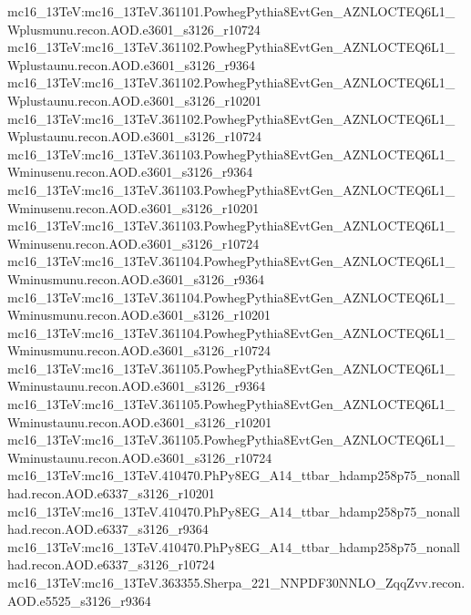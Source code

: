 { mc16\_13TeV:mc16\_13TeV.361101.PowhegPythia8EvtGen\_AZNLOCTEQ6L1\_Wplusmunu.recon.AOD.e3601\_s3126\_r10724\newline    
 mc16\_13TeV:mc16\_13TeV.361102.PowhegPythia8EvtGen\_AZNLOCTEQ6L1\_Wplustaunu.recon.AOD.e3601\_s3126\_r9364\newline    
 mc16\_13TeV:mc16\_13TeV.361102.PowhegPythia8EvtGen\_AZNLOCTEQ6L1\_Wplustaunu.recon.AOD.e3601\_s3126\_r10201\newline    
 mc16\_13TeV:mc16\_13TeV.361102.PowhegPythia8EvtGen\_AZNLOCTEQ6L1\_Wplustaunu.recon.AOD.e3601\_s3126\_r10724\newline    
 mc16\_13TeV:mc16\_13TeV.361103.PowhegPythia8EvtGen\_AZNLOCTEQ6L1\_Wminusenu.recon.AOD.e3601\_s3126\_r9364\newline    
 mc16\_13TeV:mc16\_13TeV.361103.PowhegPythia8EvtGen\_AZNLOCTEQ6L1\_Wminusenu.recon.AOD.e3601\_s3126\_r10201\newline    
 mc16\_13TeV:mc16\_13TeV.361103.PowhegPythia8EvtGen\_AZNLOCTEQ6L1\_Wminusenu.recon.AOD.e3601\_s3126\_r10724\newline    
 mc16\_13TeV:mc16\_13TeV.361104.PowhegPythia8EvtGen\_AZNLOCTEQ6L1\_Wminusmunu.recon.AOD.e3601\_s3126\_r9364\newline    
 mc16\_13TeV:mc16\_13TeV.361104.PowhegPythia8EvtGen\_AZNLOCTEQ6L1\_Wminusmunu.recon.AOD.e3601\_s3126\_r10201\newline    
 mc16\_13TeV:mc16\_13TeV.361104.PowhegPythia8EvtGen\_AZNLOCTEQ6L1\_Wminusmunu.recon.AOD.e3601\_s3126\_r10724\newline    
 mc16\_13TeV:mc16\_13TeV.361105.PowhegPythia8EvtGen\_AZNLOCTEQ6L1\_Wminustaunu.recon.AOD.e3601\_s3126\_r9364\newline    
 mc16\_13TeV:mc16\_13TeV.361105.PowhegPythia8EvtGen\_AZNLOCTEQ6L1\_Wminustaunu.recon.AOD.e3601\_s3126\_r10201\newline    
 mc16\_13TeV:mc16\_13TeV.361105.PowhegPythia8EvtGen\_AZNLOCTEQ6L1\_Wminustaunu.recon.AOD.e3601\_s3126\_r10724\newline    
 mc16\_13TeV:mc16\_13TeV.410470.PhPy8EG\_A14\_ttbar\_hdamp258p75\_nonallhad.recon.AOD.e6337\_s3126\_r10201\newline    
 mc16\_13TeV:mc16\_13TeV.410470.PhPy8EG\_A14\_ttbar\_hdamp258p75\_nonallhad.recon.AOD.e6337\_s3126\_r9364\newline    
 mc16\_13TeV:mc16\_13TeV.410470.PhPy8EG\_A14\_ttbar\_hdamp258p75\_nonallhad.recon.AOD.e6337\_s3126\_r10724\newline    
 mc16\_13TeV:mc16\_13TeV.363355.Sherpa\_221\_NNPDF30NNLO\_ZqqZvv.recon.AOD.e5525\_s3126\_r9364\newline    
}
